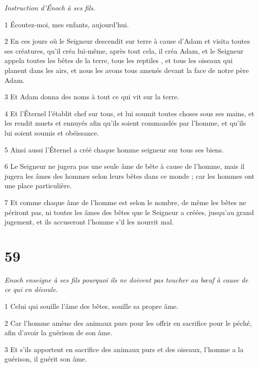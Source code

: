 \par \textit{Instruction d'Énoch à ses fils.}

\par 1 Écoutez-moi, mes enfants, aujourd'hui.

\par 2 En ces jours où le Seigneur descendit sur terre à cause d'Adam et visita toutes ses créatures, qu'il créa lui-même, après tout cela, il créa Adam, et le Seigneur appela toutes les bêtes de la terre, tous les reptiles , et tous les oiseaux qui planent dans les airs, et nous les avons tous amenés devant la face de notre père Adam.

\par 3 Et Adam donna des noms à tout ce qui vit sur la terre.

\par 4 Et l'Éternel l'établit chef sur tous, et lui soumit toutes choses sous ses mains, et les rendit muets et ennuyés afin qu'ils soient commandés par l'homme, et qu'ils lui soient soumis et obéissance.

\par 5 Ainsi aussi l'Éternel a créé chaque homme seigneur sur tous ses biens.

\par 6 Le Seigneur ne jugera pas une seule âme de bête à cause de l'homme, mais il jugera les âmes des hommes selon leurs bêtes dans ce monde ; car les hommes ont une place particulière.

\par 7 Et comme chaque âme de l'homme est selon le nombre, de même les bêtes ne périront pas, ni toutes les âmes des bêtes que le Seigneur a créées, jusqu'au grand jugement, et ils accuseront l'homme s'il les nourrit mal.

\chapter{59}

\par \textit{Enoch enseigne à ses fils pourquoi ils ne doivent pas toucher au bœuf à cause de ce qui en découle.}

\par 1 Celui qui souille l'âme des bêtes, souille sa propre âme.

\par 2 Car l'homme amène des animaux purs pour les offrir en sacrifice pour le péché, afin d'avoir la guérison de son âme.

\par 3 Et s'ils apportent en sacrifice des animaux purs et des oiseaux, l'homme a la guérison, il guérit son âme.

